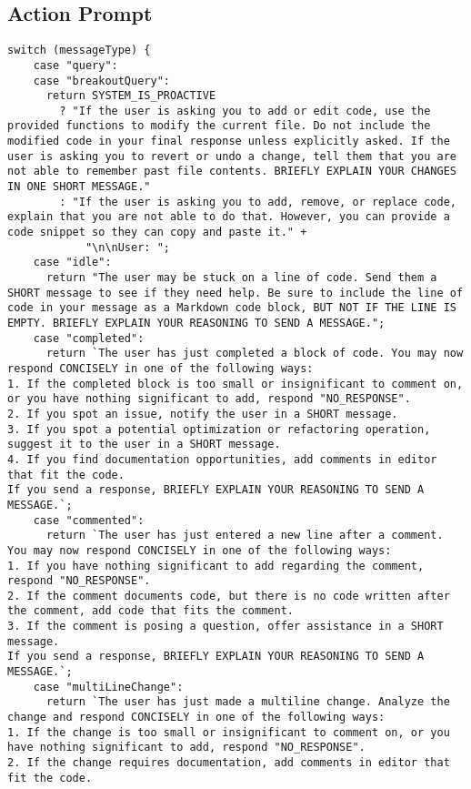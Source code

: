 \subsection{Action Prompt}
\begin{lstlisting}
switch (messageType) {
    case "query":
    case "breakoutQuery":
      return SYSTEM_IS_PROACTIVE
        ? "If the user is asking you to add or edit code, use the provided functions to modify the current file. Do not include the modified code in your final response unless explicitly asked. If the user is asking you to revert or undo a change, tell them that you are not able to remember past file contents. BRIEFLY EXPLAIN YOUR CHANGES IN ONE SHORT MESSAGE."
        : "If the user is asking you to add, remove, or replace code, explain that you are not able to do that. However, you can provide a code snippet so they can copy and paste it." +
            "\n\nUser: ";
    case "idle":
      return "The user may be stuck on a line of code. Send them a SHORT message to see if they need help. Be sure to include the line of code in your message as a Markdown code block, BUT NOT IF THE LINE IS EMPTY. BRIEFLY EXPLAIN YOUR REASONING TO SEND A MESSAGE.";
    case "completed":
      return `The user has just completed a block of code. You may now respond CONCISELY in one of the following ways:
1. If the completed block is too small or insignificant to comment on, or you have nothing significant to add, respond "NO_RESPONSE".
2. If you spot an issue, notify the user in a SHORT message.
3. If you spot a potential optimization or refactoring operation, suggest it to the user in a SHORT message.
4. If you find documentation opportunities, add comments in editor that fit the code.
If you send a response, BRIEFLY EXPLAIN YOUR REASONING TO SEND A MESSAGE.`;
    case "commented":
      return `The user has just entered a new line after a comment. You may now respond CONCISELY in one of the following ways:
1. If you have nothing significant to add regarding the comment, respond "NO_RESPONSE".
2. If the comment documents code, but there is no code written after the comment, add code that fits the comment.
3. If the comment is posing a question, offer assistance in a SHORT message.
If you send a response, BRIEFLY EXPLAIN YOUR REASONING TO SEND A MESSAGE.`;
    case "multiLineChange":
      return `The user has just made a multiline change. Analyze the change and respond CONCISELY in one of the following ways:
1. If the change is too small or insignificant to comment on, or you have nothing significant to add, respond "NO_RESPONSE".
2. If the change requires documentation, add comments in editor that fit the code.

\end{lstlisting}
